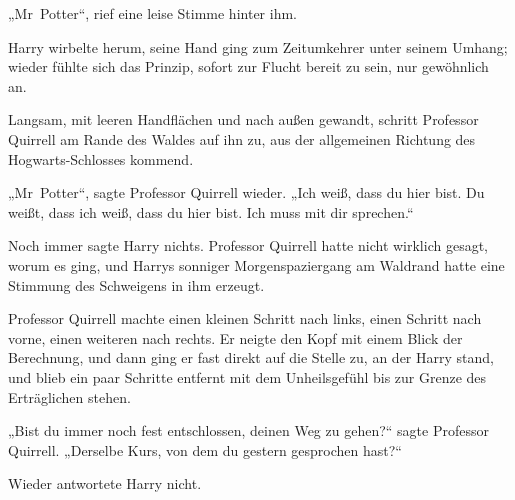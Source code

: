 „Mr~Potter“, rief eine leise Stimme hinter ihm.

Harry wirbelte herum, seine Hand ging zum Zeitumkehrer unter seinem Umhang; wieder fühlte sich das Prinzip, sofort zur Flucht bereit zu sein, nur gewöhnlich an.

Langsam, mit leeren Handflächen und nach außen gewandt, schritt Professor Quirrell am Rande des Waldes auf ihn zu, aus der allgemeinen Richtung des Hogwarts-Schlosses kommend.

„Mr~Potter“, sagte Professor Quirrell wieder. „Ich weiß, dass du hier bist. Du weißt, dass ich weiß, dass du hier bist. Ich muss mit dir sprechen.“

Noch immer sagte Harry nichts. Professor Quirrell hatte nicht wirklich gesagt, worum es ging, und Harrys sonniger Morgenspaziergang am Waldrand hatte eine Stimmung des Schweigens in ihm erzeugt.

Professor Quirrell machte einen kleinen Schritt nach links, einen Schritt nach vorne, einen weiteren nach rechts. Er neigte den Kopf mit einem Blick der Berechnung, und dann ging er fast direkt auf die Stelle zu, an der Harry stand, und blieb ein paar Schritte entfernt mit dem Unheilsgefühl bis zur Grenze des Erträglichen stehen.

„Bist du immer noch fest entschlossen, deinen Weg zu gehen?“ sagte Professor Quirrell. „Derselbe Kurs, von dem du gestern gesprochen hast?“

Wieder antwortete Harry nicht.

